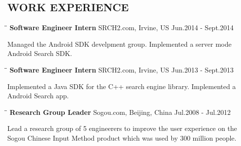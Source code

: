 \documentclass{res}
\begin{document}
 


\address{jianfeng.jia@gmail.com (949) 678-9893}
                                  
\begin{resume}

\section{WORK EXPERIENCE}
   \vspace{-0.1in}	
   \begin{tabbing}
   \hspace{2in}\= \hspace{3in}\= \kill %
    {\bf Software Engineer Intern} \>SRCH2.com, Irvine, US     \>Jun.2014 - Sept.2014\\
   \end{tabbing}\vspace{-30pt}      %
   Managed the Android SDK develpment group. Implemented a server mode Android Search SDK. 
   \vspace{-0.1in}	
   \begin{tabbing}
   \hspace{2in}\= \hspace{3in}\= \kill %
    {\bf Software Engineer Intern} \>SRCH2.com, Irvine, US     \>Jun.2013 - Sept.2013\\
   \end{tabbing}\vspace{-30pt}      %
   Implemented a Java SDK for the C++ search engine library. Implemented a Android Search app.
   \vspace{-0.1in}	
   \begin{tabbing}
   \hspace{2in}\= \hspace{3in}\= \kill %
    {\bf Research Group Leader} \>Sogou.com, Beijing, China     \>Jul.2008 - Jul.2012\\
   \end{tabbing}\vspace{-30pt}      %
   Lead a research group of 5 engineerers to improve the user experience on the Sogou Chinese Input Method product which was used by 300 million people. 

\end{resume}
\end{document}
